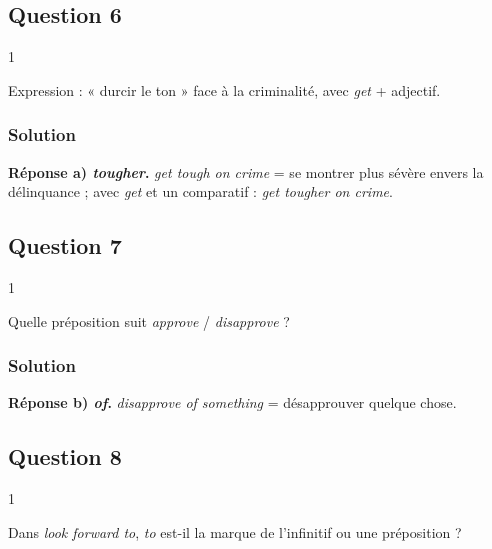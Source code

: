 \documentclass[11pt,a4paper]{article}
\begin{document}
\hypertarget{question-6}{%
\subsection{Question 6}\label{question-6}}

\begin{indication}{1}

Expression : « durcir le ton » face à la criminalité, avec \emph{get} + adjectif.

\end{indication}

\hypertarget{solution-5}{%
\subsubsection{Solution}\label{solution-5}}

\textbf{Réponse a) \emph{tougher}.} \emph{get tough on crime} = se montrer plus sévère envers la délinquance ; avec \emph{get} et un comparatif : \emph{get tougher on crime}.

\hypertarget{question-7}{%
\subsection{Question 7}\label{question-7}}

\begin{indication}{1}

Quelle préposition suit \emph{approve} / \emph{disapprove} ?

\end{indication}

\hypertarget{solution-6}{%
\subsubsection{Solution}\label{solution-6}}

\textbf{Réponse b) \emph{of}.} \emph{disapprove of something} = désapprouver quelque chose.

\hypertarget{question-8}{%
\subsection{Question 8}\label{question-8}}

\begin{indication}{1}

Dans \emph{look forward to}, \emph{to} est-il la marque de l'infinitif ou une préposition ?

\end{indication}
\end{document}
